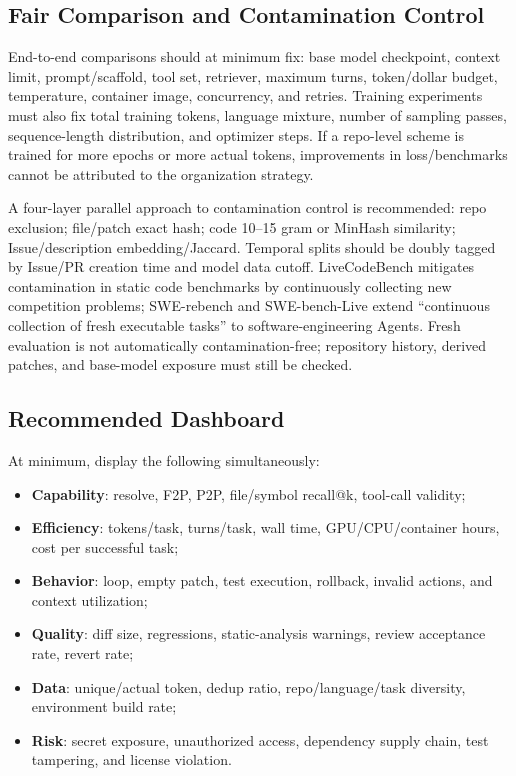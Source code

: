 \documentclass[10pt,a4paper,UTF8,fontset=none]{ctexart}
\begin{document}
\subsection{Fair Comparison and Contamination Control}

End-to-end comparisons should at minimum fix: base model checkpoint, context limit, prompt/scaffold, tool set, retriever, maximum turns, token/dollar budget, temperature, container image, concurrency, and retries. Training experiments must also fix total training tokens, language mixture, number of sampling passes, sequence-length distribution, and optimizer steps. If a repo-level scheme is trained for more epochs or more actual tokens, improvements in loss/benchmarks cannot be attributed to the organization strategy.

A four-layer parallel approach to contamination control is recommended: repo exclusion; file/patch exact hash; code 10--15 gram or MinHash similarity; Issue/description embedding/Jaccard. Temporal splits should be doubly tagged by Issue/PR creation time and model data cutoff. LiveCodeBench mitigates contamination in static code benchmarks by continuously collecting new competition problems\cite{jain2024livecodebench}; SWE-rebench and SWE-bench-Live extend ``continuous collection of fresh executable tasks'' to software-engineering Agents\cite{badertdinov2025swerebench,microsoft2026swebenchlive}. Fresh evaluation is not automatically contamination-free; repository history, derived patches, and base-model exposure must still be checked.

\subsection{Recommended Dashboard}

At minimum, display the following simultaneously:

\begin{itemize}
  \item \textbf{Capability}: resolve, F2P, P2P, file/symbol recall@k, tool-call validity;
  \item \textbf{Efficiency}: tokens/task, turns/task, wall time, GPU/CPU/container hours, cost per successful task;
  \item \textbf{Behavior}: loop, empty patch, test execution, rollback, invalid actions, and context utilization;
  \item \textbf{Quality}: diff size, regressions, static-analysis warnings, review acceptance rate, revert rate;
  \item \textbf{Data}: unique/actual token, dedup ratio, repo/language/task diversity, environment build rate;
  \item \textbf{Risk}: secret exposure, unauthorized access, dependency supply chain, test tampering, and license violation.
\end{itemize}
\end{document}
